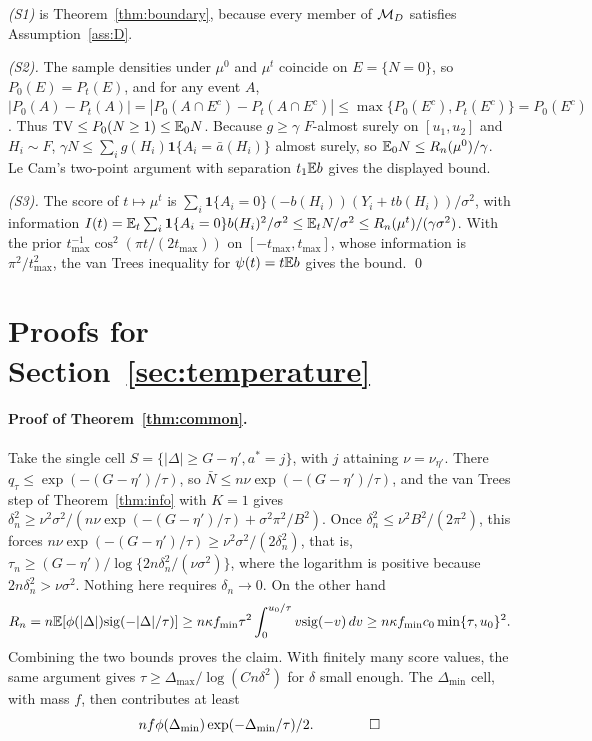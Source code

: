 \emph{(S1)} is Theorem~\ref{thm:boundary}, because every member of $\mathcal{M}_D$
satisfies Assumption~\ref{ass:D}.

\emph{(S2).} The sample densities under $\mu^0$ and $\mu^t$ coincide on
$E=\{N=0\}$, so $P_0(E)=P_t(E)$, and for any event $A$,
$|P_0(A)-P_t(A)|=|P_0(A\cap E^c)-P_t(A\cap E^c)|\le\max\{P_0(E^c),P_t(E^c)\}=P_0(E^c)$.
Thus $\mathrm{TV}\le P_0(N\ge1)\le\mathbb{E}_0N$. Because $g\ge\gamma$ $F$-almost surely on
$[u_1,u_2]$ and $H_i\sim F$, $\gamma N\le\sum_ig(H_i)\mathbf 1\{A_i=\bar a(H_i)\}$
almost surely, so $\mathbb{E}_0N\le R_n(\mu^0)/\gamma$. Le Cam's two-point argument with
separation $t_1\mathbb{E} b$ gives the displayed bound.

\emph{(S3).} The score of $t\mapsto\mu^t$ is
$\sum_i\mathbf 1\{A_i=0\}(-b(H_i))(Y_i+tb(H_i))/\sigma^2$, with information
$I(t)=\mathbb{E}_t\sum_i\mathbf 1\{A_i=0\}b(H_i)^2/\sigma^2\le\mathbb{E}_tN/\sigma^2\le R_n(\mu^t)/(\gamma\sigma^2)$.
With the prior $t_{\max}^{-1}\cos^2(\pi t/(2t_{\max}))$ on $[-t_{\max},t_{\max}]$,
whose information is $\pi^2/t_{\max}^2$, the van Trees inequality for
$\psi(t)=t\mathbb{E} b$ gives the bound. \qed

\section{Proofs for Section~\ref{sec:temperature}}\label{app:temperature}

\paragraph{Proof of Theorem~\ref{thm:common}.} Take the single cell
$S=\{|\Delta|\ge G-\eta',a^*=j\}$, with $j$ attaining $\nu=\nu_{\eta'}$. There
$q_\tau\le \exp(-(G-\eta')/\tau)$, so $\bar N\le n\nu \exp(-(G-\eta')/\tau)$, and the van
Trees step of Theorem~\ref{thm:info} with $K=1$ gives
$\delta_n^2\ge \nu^2\sigma^2/(n\nu \exp(-(G-\eta')/\tau)+\sigma^2\pi^2/B^2)$. Once
$\delta_n^2\le \nu^2B^2/(2\pi^2)$, this forces
$n\nu \exp(-(G-\eta')/\tau)\ge \nu^2\sigma^2/(2\delta_n^2)$, that is,
$\tau_n\ge(G-\eta')/\log\{2n\delta_n^2/(\nu\sigma^2)\}$, where the logarithm is
positive because $2n\delta_n^2>\nu\sigma^2$. Nothing here requires
$\delta_n\to0$. On the other hand
\[
R_n=n\mathbb{E}[\phi(|\Delta|)\mathrm{sig}(-|\Delta|/\tau)]
\ge n\kappa f_{\min}\tau^2\int_0^{u_0/\tau}v\mathrm{sig}(-v)\,dv
\ge n\kappa f_{\min}c_0\min\{\tau,u_0\}^2 .
\]
Combining the two bounds proves the
claim. With finitely many score values, the same argument gives
$\tau\ge\Delta_{\max}/\log(Cn\delta^2)$ for $\delta$ small enough. The
$\Delta_{\min}$ cell, with mass $f$, then contributes at least
\[
n f\phi(\Delta_{\min})\exp(-\Delta_{\min}/\tau)/2 . \qquad\qed
\]

